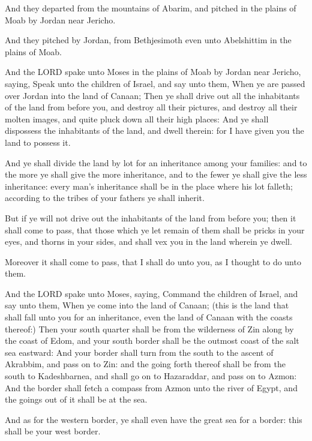 \Verse And they departed from the mountains of Abarim, and pitched in
the plains of Moab by Jordan near Jericho.

\Verse And they pitched by Jordan, from Bethjesimoth even unto
Abelshittim in the plains of Moab.

\Verse And the LORD spake unto Moses in the plains of Moab by Jordan
near Jericho, saying, \Verse Speak unto the children of Israel, and say
unto them, When ye are passed over Jordan into the land of Canaan;
\Verse Then ye shall drive out all the inhabitants of the land from
before you, and destroy all their pictures, and destroy all their
molten images, and quite pluck down all their high places: \Verse And
ye shall dispossess the inhabitants of the land, and dwell therein:
for I have given you the land to possess it.

\Verse And ye shall divide the land by lot for an inheritance among
your families: and to the more ye shall give the more inheritance, and
to the fewer ye shall give the less inheritance: every man's
inheritance shall be in the place where his lot falleth; according to
the tribes of your fathers ye shall inherit.

\Verse But if ye will not drive out the inhabitants of the land from
before you; then it shall come to pass, that those which ye let remain
of them shall be pricks in your eyes, and thorns in your sides, and
shall vex you in the land wherein ye dwell.

\Verse Moreover it shall come to pass, that I shall do unto you, as I
thought to do unto them.


\Chapter
\Verse And the LORD spake unto Moses, saying, \Verse Command the children
of Israel, and say unto them, When ye come into the land of Canaan;
(this is the land that shall fall unto you for an inheritance, even
the land of Canaan with the coasts thereof:) \Verse Then your south
quarter shall be from the wilderness of Zin along by the coast of
Edom, and your south border shall be the outmost coast of the salt sea
eastward: \Verse And your border shall turn from the south to the ascent
of Akrabbim, and pass on to Zin: and the going forth thereof shall be
from the south to Kadeshbarnea, and shall go on to Hazaraddar, and
pass on to Azmon: \Verse And the border shall fetch a compass from Azmon
unto the river of Egypt, and the goings out of it shall be at the sea.

\Verse And as for the western border, ye shall even have the great sea
for a border: this shall be your west border.

